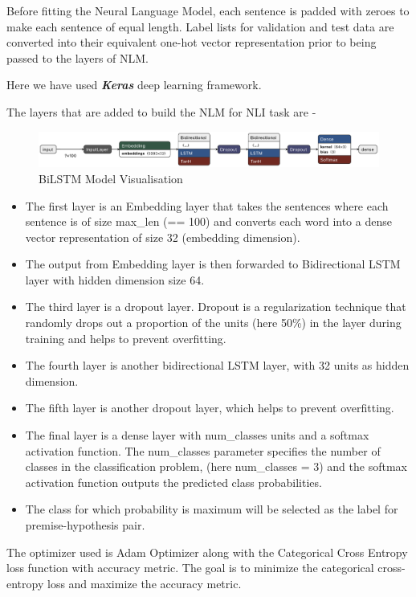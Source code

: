 Before fitting the Neural Language Model, each sentence is padded with zeroes to make each sentence of equal length. Label lists for validation and test data are converted into their equivalent one-hot vector representation prior to being passed to the layers of NLM.

Here we have used \textit{\textbf{Keras}} deep learning framework.

The layers that are added to build the NLM for NLI task are -

\begin{figure}
	\includegraphics[scale=0.3]{img/model_image_comp.png}
	\caption{BiLSTM Model Visualisation}
\end{figure}

\begin{itemize}
	\item The first layer is an Embedding layer that takes the sentences where each sentence is of size max\_len (== 100) and converts each word into a dense vector representation of size 32 (embedding dimension).
	\item The output from Embedding layer is then forwarded to Bidirectional LSTM layer with hidden dimension size 64.
	\item The third layer is a dropout layer. Dropout is a regularization technique that randomly drops out a proportion of the units (here 50\%) in the layer during training and helps to prevent overfitting.
	\item The fourth layer is another bidirectional LSTM layer, with  32 units as hidden dimension.
	\item The fifth layer is another dropout layer, which helps to prevent overfitting.
	\item The final layer is a dense layer with num\_classes units and a softmax activation function. The num\_classes parameter specifies the number of classes in the classification problem, (here num\_classes = 3) and the softmax activation function outputs the predicted class probabilities.
	\item The class for which probability is maximum will be selected as the label for premise-hypothesis pair.
\end{itemize}

The optimizer used is Adam Optimizer along with the Categorical Cross Entropy loss function with accuracy metric. The goal is to minimize the categorical cross-entropy loss and maximize the accuracy metric.

